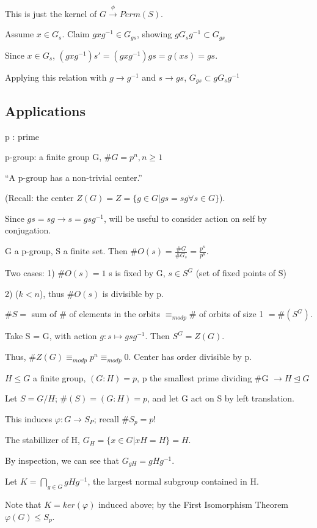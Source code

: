 \documentclass[12pt]{article}
\begin{document}
This is just the kernel of $G \xrightarrow{\phi} Perm(S)$.

\noindent
Assume $x \in G_s$.  Claim $gxg^{-1} \in G_{gs}$, showing $gG_sg^{-1} \subset G_{gs}$

Since $x \in G_s$, $(gxg^{-1})s' = (gxg^{-1})gs = g(xs) = gs$.

Applying this relation with $g \to g^{-1}$ and $s \to gs$, $G_{gs} \subset gG_sg^{-1}$

\subsection{Applications}

p : prime

\noindent
p-group: a finite group G, $\#G = p^n, n \geq 1$

\noindent
``A p-group has a non-trivial center.''

(Recall: the center $Z(G) = Z = \{g \in G | gs = sg \forall s\in G\}$).

Since $gs = sg \to s = gsg^{-1}$, will be useful to consider action on self by conjugation.

G a p-group, S a finite set.  Then $\#O(s) = \frac{\#G}{\#G_s} = \frac{p^n}{p^k}$.

Two cases: 1) $\#O(s) = 1$ s is fixed by G, $s \in S^G$ (set of fixed points of S)

2) ($k < n$), thus $\#O(s)$ is divisible by p.

$\#S =$ sum of \# of elements in the orbits $\equiv_{mod p} \#$ of orbits of size 1 $= \#(S^G)$.

Take S = G, with action $g: s \mapsto gsg^{-1}$.  Then $S^G = Z(G)$.

Thus, $\#Z(G) \equiv_{mod p} p^n \equiv_{mod p} 0$. Center has order divisible by p.

\noindent
$H \leq G$ a finite group, $(G : H) = p$, p the smallest prime dividing \#G $\to H \trianglelefteq G$

Let $S = G\slash H$; $\#(S) = (G : H) = p$, and let G act on S by left translation.

This induces $\varphi: G \to S_P$; recall $\#S_p = p!$

The stabillizer of H, $G_H = \{x \in G | xH = H\} = H$.

By inspection, we can see that $G_{gH} = gHg^{-1}$.

Let $K = \bigcap_{g \in G}gHg^{-1}$, the largest normal subgroup contained in H.

Note that $K = ker(\varphi)$ induced above; by the First Isomorphism Theorem $\varphi(G) \leq S_p$.
\end{document}
